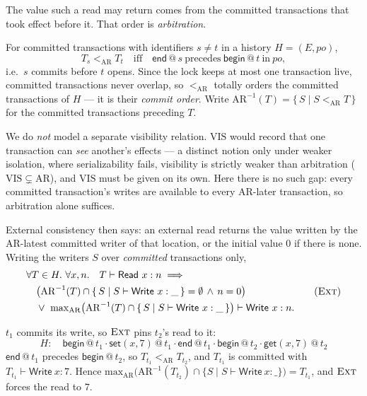 \documentclass[manuscript,nonacm]{acmart}
\makeatletter
\theoremstyle{acmdefinition}
\newcommand{\bbegin}{\textsf{begin}}
\newcommand{\eend}{\textsf{end}}
\newcommand{\getev}[3]{\textsf{get}(#1,#2)\,@\,#3}
\newcommand{\setev}[3]{\textsf{set}(#1,#2)\,@\,#3}
\newcommand{\po}{\mathit{po}}
\makeatother
\begin{document}
The value such a read may return comes from the committed transactions that took
effect before it. That order is \emph{arbitration}.

\begin{definition}[Arbitration]
For committed transactions with identifiers $s \neq t$ in a history $H = (E,\po)$,
\[
T_s <_{\mathrm{AR}} T_t \quad\text{iff}\quad
\eend\,@\,s \ \text{precedes}\ \bbegin\,@\,t \ \text{in}\ \po ,
\]
i.e.\ $s$ commits before $t$ opens. Since the lock keeps at most one transaction
live, committed transactions never overlap, so $<_{\mathrm{AR}}$ totally orders the
committed transactions of $H$ --- it is their \emph{commit order}. Write
$\mathrm{AR}^{-1}(T) = \{\, S \mid S <_{\mathrm{AR}} T \,\}$ for the committed
transactions preceding $T$.
\end{definition}

We do \emph{not} model a separate visibility relation. $\mathrm{VIS}$ would record
that one transaction can \emph{see} another's effects --- a distinct notion only
under weaker isolation, where serializability fails, visibility is strictly weaker
than arbitration ($\mathrm{VIS} \subsetneq \mathrm{AR}$), and $\mathrm{VIS}$ must be
given on its own. Here there is no such gap: every committed transaction's writes
are available to every $\mathrm{AR}$-later transaction, so arbitration alone
suffices.

External consistency then says: an external read returns the value written by the
$\mathrm{AR}$-latest committed writer of that location, or the initial value $0$ if
there is none. Writing the writers $S$ over \emph{committed} transactions only,
\[
\begin{aligned}
&\forall T \in H.\ \forall x, n.\quad T \vdash \mathsf{Read}\ x : n \implies {}\\
&\quad \bigl(\mathrm{AR}^{-1}(T) \cap \{\, S \mid S \vdash \mathsf{Write}\ x : \_ \,\} = \emptyset \,\wedge\, n = 0\bigr)\\
&\quad {}\vee\ \mathrm{max}_{\mathrm{AR}}\bigl(\mathrm{AR}^{-1}(T) \cap \{\, S \mid S \vdash \mathsf{Write}\ x : \_ \,\}\bigr) \vdash \mathsf{Write}\ x : n .
\end{aligned}
\tag{\textsc{Ext}}
\]

\begin{example}
$t_1$ commits its write, so $\textsc{Ext}$ pins $t_2$'s read to it:
\[
H:\quad \bbegin\,@\,t_1 \cdot \setev{x}{7}{t_1} \cdot \eend\,@\,t_1
      \cdot \bbegin\,@\,t_2 \cdot \getev{x}{7}{t_2}
\]
$\eend\,@\,t_1$ precedes $\bbegin\,@\,t_2$, so $T_{t_1} <_{\mathrm{AR}} T_{t_2}$, and
$T_{t_1}$ is committed with $T_{t_1} \vdash \mathsf{Write}\ x : 7$. Hence
$\mathrm{max}_{\mathrm{AR}}\bigl(\mathrm{AR}^{-1}(T_{t_2}) \cap \{S \mid S \vdash \mathsf{Write}\ x:\_\}\bigr) = T_{t_1}$,
and $\textsc{Ext}$ forces the read to $7$.
\end{example}
\end{document}
